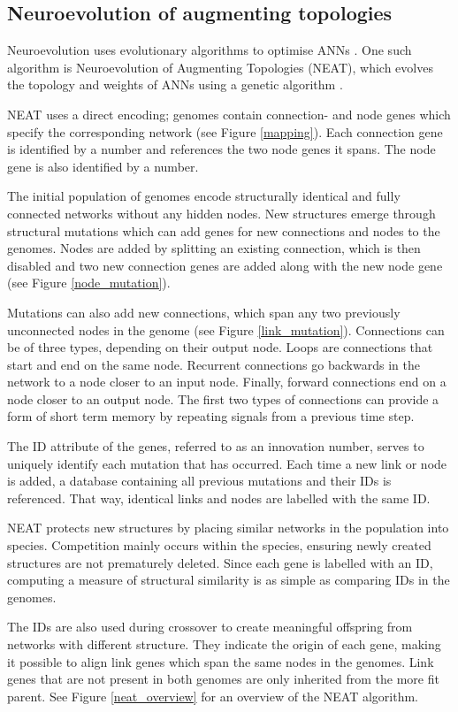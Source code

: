 \subsection{Neuroevolution of augmenting topologies}
Neuroevolution uses evolutionary algorithms to optimise ANNs \cite{neuroevolution_review}.
One such algorithm is Neuroevolution of Augmenting Topologies (NEAT), which evolves the topology and weights of ANNs
using a genetic algorithm \cite{neat_main, neat_short, neat_phd}.

NEAT uses a direct encoding; genomes contain connection- and node genes which specify the corresponding
network (see Figure \ref{mapping}). Each connection gene is identified by a number and
references the two node genes it spans. The node gene is also identified by a number.



The initial population of genomes encode structurally identical and fully connected networks without any hidden nodes.
New structures emerge through structural mutations which can add genes for new connections and nodes to the genomes.
Nodes are added by splitting an existing connection, which is then disabled and two new connection genes are added along
with the new node gene (see Figure \ref{node_mutation}).



Mutations can also add new connections, which span any two previously unconnected nodes in the genome (see Figure \ref{link_mutation}).
Connections can be of three types, depending on their output node. Loops are connections that start and end on the same node. Recurrent
connections go backwards in the network to a node closer to an input node. Finally, forward connections end on a node closer to an output
node. The first two types of connections can provide a form of short term memory by repeating signals from a previous time step.



The ID attribute of the genes, referred to as an innovation number, serves to uniquely identify each mutation that has occurred.
Each time a new link or node is added, a database containing all previous mutations and their IDs is referenced. That way,
identical links and nodes are labelled with the same ID.

NEAT protects new structures by placing similar networks in the population into species.
Competition mainly occurs within the species, ensuring newly created structures are not prematurely deleted.
Since each gene is labelled with an ID, computing a measure of structural similarity is as simple as
comparing IDs in the genomes.

The IDs are also used during crossover to create meaningful offspring from networks with different structure.
They indicate the origin of each gene, making it possible to align link genes which span the same nodes in the genomes. Link genes
that are not present in both genomes are only inherited from the more fit parent. See Figure \ref{neat_overview} for an overview
of the NEAT algorithm.


